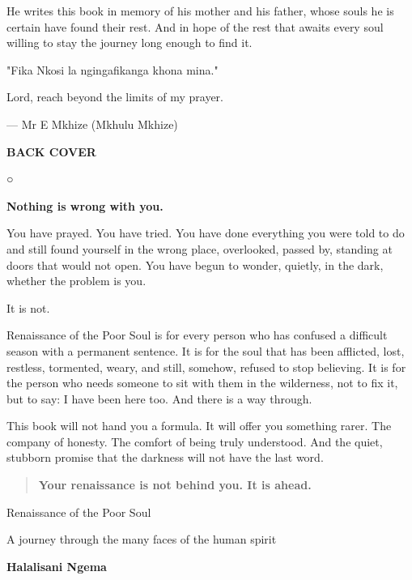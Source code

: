 He writes this book in memory of his mother and his father, whose souls
he is certain have found their rest. And in hope of the rest that awaits
every soul willing to stay the journey long enough to find it.

"Fika Nkosi la ngingafikanga khona mina."

Lord, reach beyond the limits of my prayer.

--- Mr E Mkhize (Mkhulu Mkhize)

\textbf{BACK COVER}

○

\textbf{Nothing is wrong with you.}

You have prayed. You have tried. You have done everything you were told
to do and still found yourself in the wrong place, overlooked, passed
by, standing at doors that would not open. You have begun to wonder,
quietly, in the dark, whether the problem is you.

It is not.

Renaissance of the Poor Soul is for every person who has confused a
difficult season with a permanent sentence. It is for the soul that has
been afflicted, lost, restless, tormented, weary, and still, somehow,
refused to stop believing. It is for the person who needs someone to sit
with them in the wilderness, not to fix it, but to say: I have been here
too. And there is a way through.

This book will not hand you a formula. It will offer you something
rarer. The company of honesty. The comfort of being truly understood.
And the quiet, stubborn promise that the darkness will not have the last
word.

\begin{quote}
\textbf{Your renaissance is not behind you. It is ahead.}
\end{quote}

Renaissance of the Poor Soul

A journey through the many faces of the human spirit

\textbf{Halalisani Ngema}
